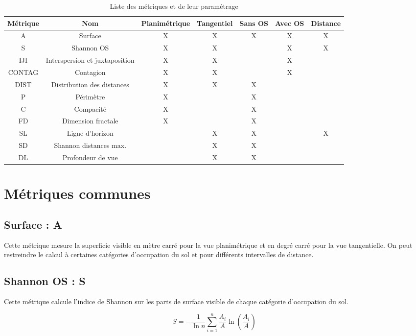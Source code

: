 \documentclass{report}
\begin{document}
\begin{table}[H]
	\begin{tabular}{|c|c|c|c|c|c|c|}
		\hline
		Métrique & Nom & Planimétrique & Tangentiel & Sans OS & Avec OS & Distance\\
		\hline
		A & Surface & X & X & X & X & X\\
		\hline
		S & Shannon OS & X & X &  & X & X\\
		\hline
		IJI & Interspersion et juxtaposition & X & X &  & X & \\
		\hline
		CONTAG & Contagion & X & X &  & X & \\
		\hline
		DIST & Distribution des distances & X & X & X &  & \\
		\hline
		P & Périmètre & X &  & X &  & \\
		\hline
		C & Compacité & X &  & X &  & \\
		\hline
		FD & Dimension fractale & X &  & X &  & \\
		\hline
		SL & Ligne d'horizon &  & X & X &  & X \\
		\hline
		SD & Shannon distances max. &  & X & X &  & \\
		\hline
		DL & Profondeur de vue &  & X & X &  & \\		
		\hline
	\end{tabular}
	\caption{Liste des métriques et de leur paramétrage}
	\label{metrics_tab}
\end{table}

\section{Métriques communes}

\subsection{Surface : A}
Cette métrique mesure la superficie visible en mètre carré pour la vue planimétrique et en degré carré pour la vue tangentielle. On peut restreindre le calcul à certaines catégories d'occupation du sol et pour différents intervalles de distance.


\subsection{Shannon OS : S}
Cette métrique calcule l'indice de Shannon sur les parts de surface visible de chaque catégorie d'occupation du sol.

$$S = -\frac{1}{\ln n}\sum_{i=1}^{n}\frac{A_i}{A}\ln\left(\frac{A_i}{A}\right)$$
\end{document}
